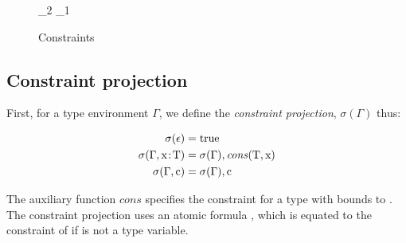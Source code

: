 \documentclass[preprint,nocopyrightspace,9pt]{sigplanconf}
\begin{document}
\begin{figure}
        {  \vdashC {}_2 \equals {}_1 }







\caption{Constraints}
\label{fig:subtyping}
\label{fig:constraints}
\end{figure}



\subsection{
Constraint projection
}

First, for a type environment $\Gamma$,
we define the \emph{constraint projection},
$\sigma(\Gamma)$ thus:

\begin{align*}
\sigma(\epsilon) &= \Xcd{true} \\
\sigma(\Gamma, \Xcd{x} \ty \Xcd{T}) &=
        \sigma(\Gamma),
        \cons{\Xcd{T}}{\Xcd{x}}
\\
\sigma(\Gamma, \Xcd{c}) &= \sigma(\Gamma), \Xcd{c} \\
\end{align*}

The auxiliary function $\mathit{cons}$
specifies the constraint for a type  with 
bounds to .
The constraint projection uses an atomic formula ,
which is equated to the constraint of  if  is not
a type variable.
\end{document}
